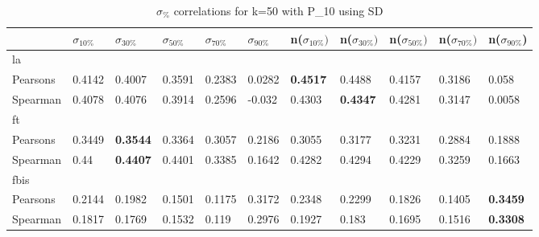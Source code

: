 \documentclass{sig-alternate}
\begin{document}
\begin{table}[h!]
\centering
\begin{tabular}{|l||l|l|l|l|l||l|l|l|l|l|}
\hline
& $\sigma_{10\%}$ & $\sigma_{30\%}$ & $\sigma_{50\%}$ & $\sigma_{70\%}$ & $\sigma_{90\%}$ & n($\sigma_{10\%})$ & n($\sigma_{30\%})$ & n($\sigma_{50\%})$ & n($\sigma_{70\%})$ & n($\sigma_{90\%}$) \\ \hline
\hline la &  &  &  &  &  &  &  &  &  &  \\ \hline
Pearsons & 0.4142 & 0.4007 & 0.3591 & 0.2383 & 0.0282 & \textbf{0.4517} & 0.4488 & 0.4157 & 0.3186 & 0.058 \\ \hline
Spearman & 0.4078 & 0.4076 & 0.3914 & 0.2596 & -0.032 & 0.4303 & \textbf{0.4347} & 0.4281 & 0.3147 & 0.0058 \\ \hline
\hline ft &  &  &  &  &  &  &  &  &  &  \\ \hline
Pearsons & 0.3449 & \textbf{0.3544} & 0.3364 & 0.3057 & 0.2186 & 0.3055 & 0.3177 & 0.3231 & 0.2884 & 0.1888 \\ \hline
Spearman & 0.44 & \textbf{0.4407} & 0.4401 & 0.3385 & 0.1642 & 0.4282 & 0.4294 & 0.4229 & 0.3259 & 0.1663 \\ \hline
\hline fbis &  &  &  &  &  &  &  &  &  &  \\ \hline
Pearsons & 0.2144 & 0.1982 & 0.1501 & 0.1175 & 0.3172 & 0.2348 & 0.2299 & 0.1826 & 0.1405 & \textbf{0.3459} \\ \hline
Spearman & 0.1817 & 0.1769 & 0.1532 & 0.119 & 0.2976 & 0.1927 & 0.183 & 0.1695 & 0.1516 & \textbf{0.3308} \\ \hline
\end{tabular}
\caption{$\sigma_{\%}$ correlations for k=50 with P\_10 using SD}
\end{table}
\end{document}
